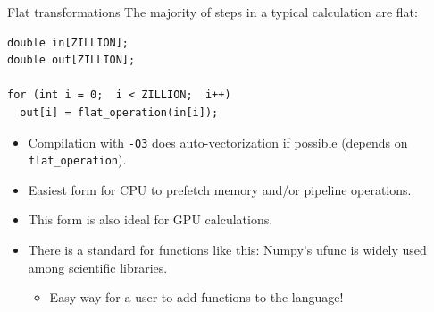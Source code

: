 \documentclass{beamer}
\begin{document}
\begin{frame}[fragile]{Flat transformations}
\vspace{0.5 cm}
The majority of steps in a typical calculation are flat:

\begin{center}
\begin{minipage}{0.7\linewidth}
\small
\begin{verbatim}
double in[ZILLION];
double out[ZILLION];

for (int i = 0;  i < ZILLION;  i++)
  out[i] = flat_operation(in[i]);
\end{verbatim}
\end{minipage}
\end{center}



\begin{itemize}
\item Compilation with {\tt -O3} does auto-vectorization if possible (depends on {\tt flat\_operation}).
\item Easiest form for CPU to prefetch memory and/or pipeline operations.
\item This form is also ideal for GPU calculations.
\item There is a standard for functions like this: Numpy's ufunc is widely used among scientific libraries.
\begin{itemize}
\item Easy way for a user to add functions to the language!
\end{itemize}
\end{itemize}
\end{frame}
\end{document}
